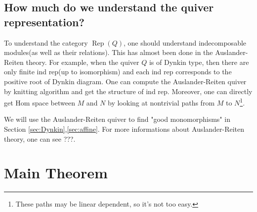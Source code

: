 \documentclass[reqno,11pt]{amsart}
\numberwithin{equation}{section}
\theoremstyle{plain}
\theoremstyle{plain}
\numberwithin{equation}{section}
\theoremstyle{remark}
\DeclareMathOperator{\Rep}{\operatorname{Rep}}
\begin{document}
\subsection{How much do we understand the quiver representation?}
To understand the category $\Rep(Q)$, one should understand indecomposable modules(as well as their relations). This has almost been done in the Auslander-Reiten theory. For example, when the quiver $Q$ is of Dynkin type, then there are only finite ind rep(up to isomorphism) and each ind rep corresponds to the positive root of Dynkin diagram. One can compute the Auslander-Reiten quiver by knitting algorithm and get the structure of ind rep. Moreover, one can directly get Hom space between $M$ and $N$ by looking at nontrivial paths from $M$ to $N$\footnote{These paths may be linear dependent, so it's not too easy.}.

We will use the Auslander-Reiten quiver to find "good monomorphisms" in Section \ref{sec:Dynkin},\ref{sec:affine}. For more informations about Auslander-Reiten theory, one can see ???.

\section{Main Theorem}\label{sec:mainthm}
   
\end{document}
